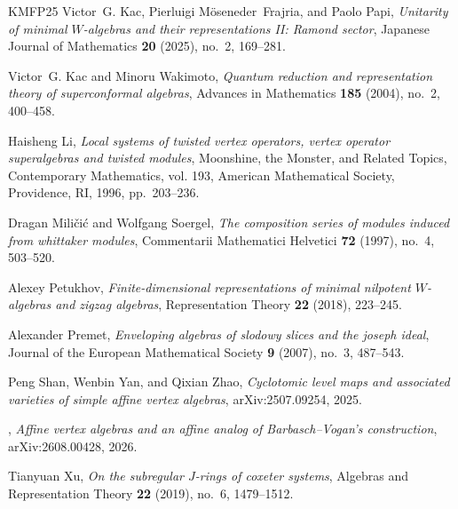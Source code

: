 \documentclass[11pt]{amsart}
\theoremstyle{remark}
\numberwithin{equation}{section}
\begin{document}
\begin{thebibliography}{KMFP25}
Victor~G. Kac, Pierluigi M\"oseneder~Frajria, and Paolo Papi, \emph{Unitarity
  of minimal {$W$}-algebras and their representations {II}: {Ramond} sector},
  Japanese Journal of Mathematics \textbf{20} (2025), no.~2, 169--281.

Victor~G. Kac and Minoru Wakimoto, \emph{Quantum reduction and representation
  theory of superconformal algebras}, Advances in Mathematics \textbf{185}
  (2004), no.~2, 400--458.

Haisheng Li, \emph{Local systems of twisted vertex operators, vertex operator
  superalgebras and twisted modules}, Moonshine, the Monster, and Related
  Topics, Contemporary Mathematics, vol. 193, American Mathematical Society,
  Providence, RI, 1996, pp.~203--236.

Dragan Mili\v{c}i\'c and Wolfgang Soergel, \emph{The composition series of
  modules induced from whittaker modules}, Commentarii Mathematici Helvetici
  \textbf{72} (1997), no.~4, 503--520.

Alexey Petukhov, \emph{Finite-dimensional representations of minimal nilpotent
  {$W$}-algebras and zigzag algebras}, Representation Theory \textbf{22}
  (2018), 223--245.

Alexander Premet, \emph{Enveloping algebras of slodowy slices and the joseph
  ideal}, Journal of the European Mathematical Society \textbf{9} (2007),
  no.~3, 487--543.

Peng Shan, Wenbin Yan, and Qixian Zhao, \emph{Cyclotomic level maps and
  associated varieties of simple affine vertex algebras}, arXiv:2507.09254, 2025.

\bysame, \emph{Affine vertex algebras and an affine analog of
  {Barbasch--Vogan}'s construction}, arXiv:2608.00428, 2026.

Tianyuan Xu, \emph{On the subregular {$J$}-rings of coxeter systems}, Algebras
  and Representation Theory \textbf{22} (2019), no.~6, 1479--1512.

\end{thebibliography}
\end{document}
